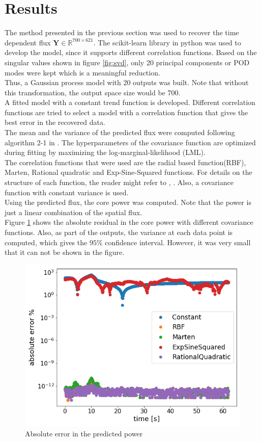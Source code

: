 \documentclass{anstrans}
\begin{document}
\section{Results}
The method presented in the previous section was used to recover the time dependent flux $\textbf{Y} \in \mathbb{R}^{700\times 621}$. The scikit-learn library in python\cite{scikit-learn} was used to develop the model, since it supports different correlation functions.
Based on the singular values shown in figure \ref{fig:svd}, only 20 principal components or POD modes were kept which is a meaningful reduction.\\
 Thus, a Gaussian process model with 20 outputs was built. Note that without this transformation, the output space size would be 700.\\
A fitted model with a constant trend function is developed. Different correlation functions are tried to   select a model with a correlation function that gives the best error in the recovered data. \\
The mean and the variance of the predicted flux were computed following algorithm 2-1 in \cite{rasmussen2003gaussian}. The hyperparameters of the covariance function are optimized during fitting by maximizing the log-marginal-likelihood (LML).\\
The correlation functions that were used are the radial based function(RBF), Marten, Rational quadratic and Exp-Sine-Squared functions.
For details on the structure of each function, the reader might refer to \cite{rasmussen2003gaussian}, \cite{mackay1998introduction}. Also, a covariance function with constant variance is used.\\
Using the predicted flux, the core power was computed. Note that the power is just a linear combination of the spatial flux.\\
Figure \ref{gp_kernels} shows the absolute residual in the core power with different covariance functions.
Also, as part of the outputs, the variance at each data point is computed, which gives the $95\%$ confidence interval. However, it was very small that it can not be shown in the figure.
\begin{figure}[ht!]
	\includegraphics[scale=0.4]{./figs/gp_kernels.png}
	\caption{Absolute error in the predicted power}
	\label{gp_kernels}
\end{figure}
\end{document}
